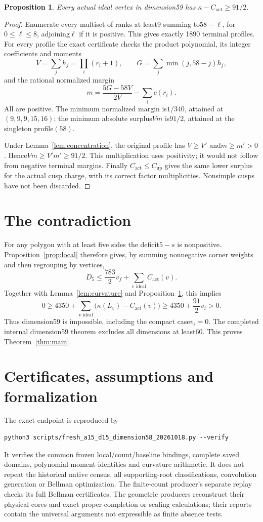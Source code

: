 \documentclass[11pt]{article}
\newtheorem{proposition}[theorem]{Proposition}
\theoremstyle{remark}\newtheorem{remark}[theorem]{Remark}
\newcommand{\Dfive}{D_5}
\newcommand{\actual}{\mathrm{act}}
\newcommand{\upper}{\mathrm{up}}
\begin{document}
\begin{proposition}\label{prop:ideal}
Every actual ideal vertex in dimension59 has
$\kappa-C_{\actual}\geq91/2$.
\end{proposition}
\begin{proof}
Enumerate every multiset of ranks at least9 summing to$58-\ell$, for
$0\leq\ell\leq8$, adjoining$\ell$ if it is positive. This gives exactly
1890 terminal profiles. For every profile the exact certificate checks
the product polynomial, its integer coefficients and moments
\[
 V=\sum_jh_j=\prod_i(r_i+1),\qquad
 G=\sum_j\min(j,58-j)h_j,
\]
and the rational normalized margin
\[
 m=\frac{5G-58V}{2V}-\sum_i c(r_i).
\]
All are positive. The minimum normalized margin is$1/340$, attained
at$(9,9,9,15,16)$; the minimum absolute surplus$Vm$ is$91/2$, attained
at the singleton profile$(58)$.

Under Lemma~\ref{lem:concentration}, the original profile has
$V\geq V'$ and$m\geq m'>0$. Hence$Vm\geq V'm'\geq91/2$.
This multiplication uses positivity; it would not follow from negative
terminal margins. Finally $C_{\actual}\leq C_{\upper}$ gives the same
lower surplus for the actual cusp charge, with its correct factor
multiplicities. Nonsimple cusps have not been discarded.
\end{proof}

\section{The contradiction}

For any polygon with at least five sides the deficit$5-s$ is nonpositive.
Proposition~\ref{prop:local} therefore gives, by summing nonnegative
corner weights and then regrouping by vertices,
\[
 \Dfive\leq\frac{783}{2}v_f+\sum_{v\text{ ideal}}C_{\actual}(v).
\]
Together with Lemma~\ref{lem:curvature} and Proposition~\ref{prop:ideal},
this implies
\[
 0\geq4350+\sum_{v\text{ ideal}}
       \bigl(\kappa(L_v)-C_{\actual}(v)\bigr)
   \geq4350+\frac{91}{2}v_i>0.
\]
Thus dimension59 is impossible, including the compact case$v_i=0$.
The completed internal dimension59 theorem excludes all dimensions
at least60. This proves Theorem~\ref{thm:main}.

\section{Certificates, assumptions and formalization}

The exact endpoint is reproduced by
\begin{verbatim}
python3 scripts/fresh_a15_d15_dimension58_20261018.py --verify
\end{verbatim}
It verifies the common frozen local/count/baseline bindings, complete
saved domains, polynomial moment identities and curvature arithmetic.
It does not repeat the historical native census, all supporting-root
classifications, convolution generation or Bellman optimization.
The finite-count producer's separate replay checks its full Bellman
certificates. The geometric producers reconstruct their physical cores
and exact proper-completion or sealing calculations; their reports
contain the universal arguments not expressible as finite absence tests.
\end{document}
